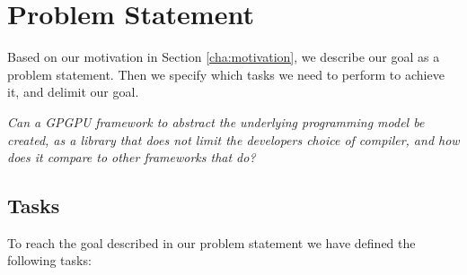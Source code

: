 \section{Problem Statement}
Based on our motivation in Section \ref{cha:motivation}, we describe our goal as a problem statement. Then we specify which tasks we need to perform to achieve it, and delimit our goal.

\textit{Can a GPGPU framework to abstract the underlying programming model be created, as a library that does not limit the developers choice of compiler, and
how does it compare to other frameworks that do?}


\subsection{Tasks} \label{cha:tasks}
To reach the goal described in our problem statement we have defined the following tasks:


